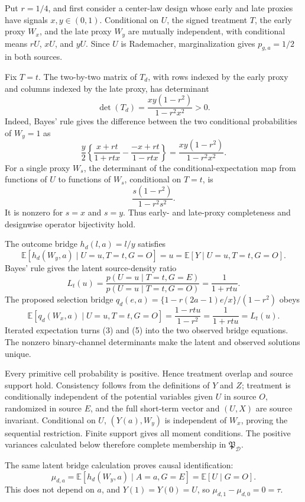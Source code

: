 Put \(r=1/4\), and first consider a center-law design whose early and late proxies have signals \(x,y\in(0,1)\). Conditional on \(U\), the signed treatment \(T\), the early proxy \(W_x\), and the late proxy \(W_y\) are mutually independent, with conditional means \(rU\), \(xU\), and \(yU\). Since \(U\) is Rademacher, marginalization gives \(p_{g,a}=1/2\) in both sources.

Fix \(T=t\). The two-by-two matrix of \(T_d\), with rows indexed by the early proxy and columns indexed by the late proxy, has determinant
\[
 \det(T_d)=\frac{xy(1-r^2)}{1-r^2x^2}>0. \tag{1}
\]
Indeed, Bayes' rule gives the difference between the two conditional probabilities of \(W_y=1\) as
\[
 \frac y2\left\{
 \frac{x+rt}{1+rtx}-\frac{-x+rt}{1-rtx}
 \right\}
 =\frac{xy(1-r^2)}{1-r^2x^2}.
\]
For a single proxy \(W_s\), the determinant of the conditional-expectation map from functions of \(U\) to functions of \(W_s\), conditional on \(T=t\), is
\[
 \frac{s(1-r^2)}{1-r^2s^2}. \tag{2}
\]
It is nonzero for \(s=x\) and \(s=y\). Thus early- and late-proxy completeness and designwise operator bijectivity hold.

The outcome bridge \(h_d(l,a)=l/y\) satisfies
\[
 \mathbb E[h_d(W_y,a)\mid U=u,T=t,G=O]=u
 =\mathbb E[Y\mid U=u,T=t,G=O]. \tag{3}
\]
Bayes' rule gives the latent source-density ratio
\[
 L_t(u)=\frac{p(U=u\mid T=t,G=E)}{p(U=u\mid T=t,G=O)}
 =\frac1{1+rtu}. \tag{4}
\]
The proposed selection bridge \(q_d(e,a)=\{1-r(2a-1)e/x\}/(1-r^2)\) obeys
\[
 \mathbb E[q_d(W_x,a)\mid U=u,T=t,G=O]
 =\frac{1-rtu}{1-r^2}
 =\frac1{1+rtu}=L_t(u). \tag{5}
\]
Iterated expectation turns (3) and (5) into the two observed bridge equations. The nonzero binary-channel determinants make the latent and observed solutions unique.

Every primitive cell probability is positive. Hence treatment overlap and source support hold. Consistency follows from the definitions of \(Y\) and \(Z\); treatment is conditionally independent of the potential variables given \(U\) in source \(O\), randomized in source \(E\), and the full short-term vector and \((U,X)\) are source invariant. Conditional on \(U\), \((Y(a),W_y)\) is independent of \(W_x\), proving the sequential restriction. Finite support gives all moment conditions. The positive variances calculated below therefore complete membership in \(\mathfrak P_{\mathcal D}\).

The same latent bridge calculation proves causal identification:
\[
 \mu_{d,a}
 =\mathbb E[h_d(W_y,a)\mid A=a,G=E]
 =\mathbb E[U\mid G=O]. \tag{6}
\]
This does not depend on \(a\), and \(Y(1)=Y(0)=U\), so \(\mu_{d,1}-\mu_{d,0}=0=\tau\).

